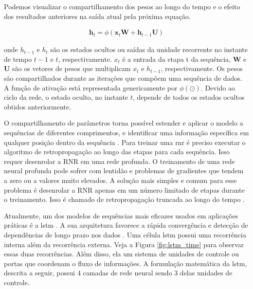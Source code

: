 Podemos visualizar o compartilhamento dos pesos ao longo do tempo e o efeito dos resultados anteriores na saída atual pela próxima equação. 

\begin{equation}
\label{eq:memoria}
\begin{aligned}
\textbf{h}_{t} =  \phi( \textbf{x}_{t} \textbf{W} + \textbf{h}_{t-1} \textbf{U}) 
\end{aligned}
\end{equation}

\noindent onde  $h_{t-1}$ e $h_{t}$ são os estados ocultos ou saídas da unidade recorrente no instante de tempo $t-1$ e $t$, respectivamente.  $x_{t}$ é a entrada da etapa  t da sequência, $\textbf{W}$ e $\textbf{U}$ são os vetores de pesos que multiplicam $x_{t}$ e $h_{t-1}$, respectivamente. Os pesos são compartilhados durante as iterações que compõem uma sequência de dados. A função de ativação está representada genericamente por $\phi \left( \odot \right)$. Devido ao ciclo da rede, o estado oculto, no instante $t$, depende de todos os estados ocultos obtidos anteriormente.  

O compartilhamento de parâmetros torna possível estender e aplicar o modelo a sequências de diferentes comprimentos, e identificar uma informação específica em qualquer posição dentro da sequência \cite{Goodfellow2016}. 
Para treinar uma \acrshort{rnr} é preciso executar o algoritmo de retropropagação ao longo das etapas para cada sequência. Isso requer desenrolar a RNR em uma rede profunda. O treinamento de uma rede neural profunda pode sofrer com lentidão e problemas de gradientes que tendem a zero ou a valores muito elevados. A solução mais simples e comum para esse problema é desenrolar a RNR apenas em um número limitado de etapas durante o treinamento. Isso é chamado de retropropagação truncada ao longo do tempo \cite{geron2017hands}.

Atualmente, um dos modelos de sequências mais eficazes usados em aplicações práticas é a \gls{lstm} \cite{lstm}. A sua arquitetura favorece a rápida convergência e detecção de dependências de longo prazo nos dados \cite{geron2017hands}.
Uma célula \acrshort{lstm} possui uma recorrência interna além da recorrência externa. Veja a Figura \ref{fig:lstm_time} para observar essas duas recorrências. Além disso, ela 
um sistema de unidades de controle ou portas que coordenam o fluxo de informações.  A formulação matemática da \acrshort{lstm}, descrita a seguir, possui 4 camadas de rede neural sendo 3 delas unidades de controle. 

